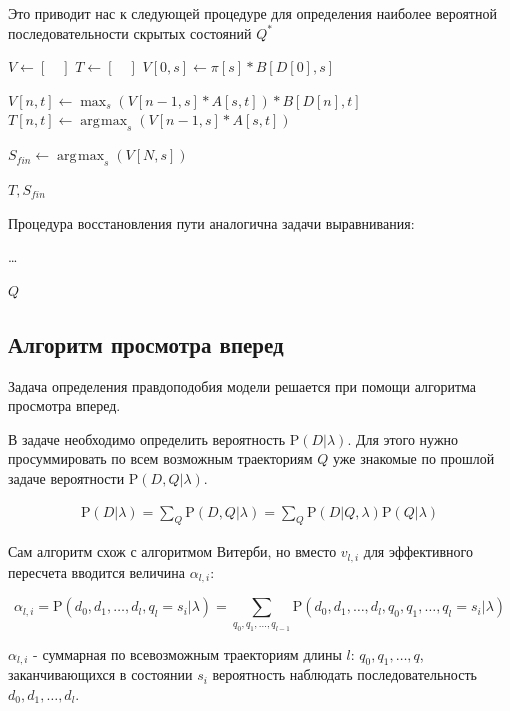\documentclass[letterpaper, 11pt]{article}
\newcommand{\prob}{\mathrm{P}}
\DeclareMathOperator*{\argmax}{\arg\!\max}
\begin{document}
Это приводит нас к следующей процедуре для определения наиболее вероятной последовательности скрытых состояний $Q^*$

\begin{algorithmic}[2]
\State $V\gets [\quad]$
\State $T\gets [\quad]$
\State $V[0,s]\gets \pi[s]*B[D[0],s]$
\EndFor

\State $V[n,t]\gets \max_s(V[n-1,s]*A[s,t])*B[D[n],t]$
\State $T[n,t]\gets \argmax_s(V[n-1,s]*A[s,t])$
\EndFor
\EndFor

\State $S_{fin}\gets \argmax_s(V[N,s])$

\Return $T, S_{fin}$
\EndProcedure

\end{algorithmic}

Процедура восстановления пути аналогична задачи выравнивания:

\begin{algorithmic}[2]

\ldots

\Return $Q$
\EndProcedure
\end{algorithmic}

\subsection{Алгоритм просмотра вперед}

Задача определения правдоподобия модели решается при помощи алгоритма просмотра вперед.

В задаче необходимо определить вероятность $\prob(D|\lambda)$. Для этого нужно просуммировать по всем возможным траекториям $Q$ уже знакомые по прошлой задаче вероятности $\prob(D,Q|\lambda)$.

\begin{gather}
\prob(D|\lambda)=\sum_{Q} \prob(D,Q|\lambda)=\sum_{Q}\prob(D|Q,\lambda)\prob(Q|\lambda)
\end{gather}

Сам алгоритм схож с алгоритмом Витерби, но вместо $v_{l,i}$ для эффективного пересчета вводится величина $\alpha_{l,i}$:

$$\alpha_{l,i}=\prob(d_0,d_1,\ldots,d_l,q_l=s_i|\lambda)=\sum_{q_0,q_1,\ldots,q_{l-1}}\prob(d_0,d_1,\ldots,d_l,q_0,q_1,\ldots,q_l=s_i|\lambda)$$

$\alpha_{l,i}$ - суммарная по всевозможным траекториям длины $l$: $q_0,q_1,\ldots,q$, заканчивающихся в состоянии $s_i$ вероятность наблюдать последовательность $d_0,d_1,\ldots,d_l$.
\end{document}
